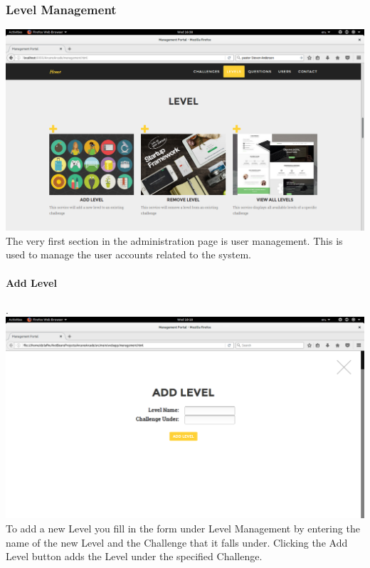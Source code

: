 \documentclass[english]{article}
\begin{document}
				
				
			\newpage		
			\subsubsection{Level Management}
				\includegraphics[width=\linewidth]{Level.png}				\newline
				The very first section in the administration page is user management. This is used to manage the user accounts related to the system.
				\\[12pt]\newline
				
				\paragraph{Add Level}. \\ \newline
				\includegraphics[width=\linewidth]{AddLevel.png}				\newline
To add a new Level you fill in the form under Level Management by entering the name of the new Level and the Challenge that it falls under. Clicking the Add Level button adds the Level under the specified Challenge.
				\\[12pt]\newline
\end{document}
